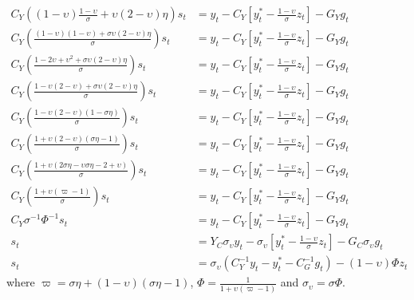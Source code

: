 \begin{align}   
    C_Y\left((1-\upsilon)\frac{1-\upsilon}{\sigma} + \upsilon (2-\upsilon)\eta \right) s_t &= y_t - C_Y\left[y^*_t - \frac{1-\upsilon}{\sigma}z_t\right] - G_Y g_t\\
    C_Y\left(\frac{(1-\upsilon)(1-\upsilon) + \sigma\upsilon (2-\upsilon)\eta}{\sigma} \right) s_t &= y_t - C_Y\left[y^*_t - \frac{1-\upsilon}{\sigma}z_t\right] - G_Y g_t\\
    C_Y\left(\frac{1 -2\upsilon + \upsilon^2 + \sigma\upsilon (2-\upsilon)\eta}{\sigma} \right) s_t &= y_t - C_Y\left[y^*_t - \frac{1-\upsilon}{\sigma}z_t\right] - G_Y g_t\\
    C_Y\left(\frac{1 - \upsilon (2-\upsilon) + \sigma\upsilon (2-\upsilon)\eta}{\sigma} \right) s_t &= y_t - C_Y\left[y^*_t - \frac{1-\upsilon}{\sigma}z_t\right] - G_Y g_t\\
    C_Y\left(\frac{1 - \upsilon (2-\upsilon)(1-\sigma \eta)}{\sigma} \right) s_t &= y_t - C_Y\left[y^*_t - \frac{1-\upsilon}{\sigma}z_t\right] - G_Y g_t\\
    C_Y\left(\frac{1 + \upsilon (2-\upsilon)(\sigma \eta - 1)}{\sigma} \right) s_t &= y_t - C_Y\left[y^*_t - \frac{1-\upsilon}{\sigma}z_t\right] - G_Y g_t\\
    C_Y\left(\frac{1 + \upsilon (2\sigma \eta-\upsilon\sigma \eta -2 + \upsilon)}{\sigma} \right) s_t &= y_t - C_Y\left[y^*_t - \frac{1-\upsilon}{\sigma}z_t\right] - G_Y g_t\\
    C_Y\left(\frac{1 + \upsilon (\varpi - 1)}{\sigma} \right) s_t &= y_t - C_Y\left[y^*_t - \frac{1-\upsilon}{\sigma}z_t\right] - G_Y g_t\\
    C_Y \sigma^{-1} \Phi^{-1} s_t &= y_t - C_Y\left[y^*_t - \frac{1-\upsilon}{\sigma}z_t\right] - G_Y g_t\\
    s_t &= Y_C \sigma_\upsilon y_t - \sigma_\upsilon\left[y^*_t - \frac{1-\upsilon}{\sigma}z_t\right] - G_C \sigma_\upsilon g_t\\
    s_t &= \sigma_\upsilon(C_Y^{-1} y_t - y^*_t - C_G^{-1} g_t) - (1-\upsilon)\Phi z_t \label{eq:terms_of_trade_derivation_end}
\end{align}
where $\varpi = \sigma \eta + (1-\upsilon)(\sigma \eta - 1)$, $\Phi = \frac{1}{1 + \upsilon (\varpi - 1)}$ and $\sigma_\upsilon = \sigma \Phi$.
\newpage